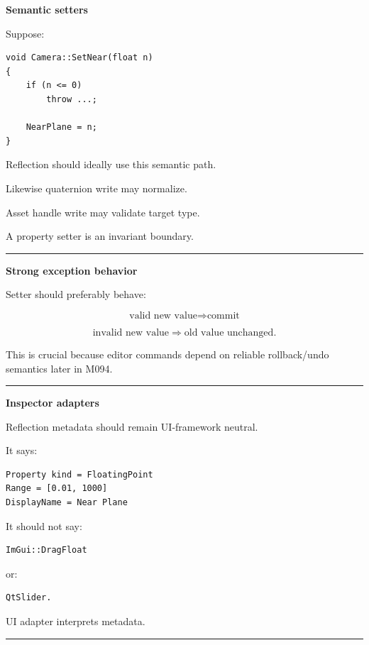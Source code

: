 \textbf{Semantic setters}

Suppose:

\begin{verbatim}
void Camera::SetNear(float n)
{
    if (n <= 0)
        throw ...;

    NearPlane = n;
}
\end{verbatim}

Reflection should ideally use this semantic path.

Likewise quaternion write may normalize.

Asset handle write may validate target type.

A property setter is an invariant boundary.

\begin{center}\rule{0.5\linewidth}{0.5pt}\end{center}

\textbf{Strong exception behavior}

Setter should preferably behave:

\[
\text{valid new value}
\Rightarrow
\text{commit}
\]

\[
\text{invalid new value}
\Rightarrow
\text{old value unchanged}.
\]

This is crucial because editor commands depend on reliable rollback/undo semantics later in M094.

\begin{center}\rule{0.5\linewidth}{0.5pt}\end{center}

\textbf{Inspector adapters}

Reflection metadata should remain UI-framework neutral.

It says:

\begin{verbatim}
Property kind = FloatingPoint
Range = [0.01, 1000]
DisplayName = Near Plane
\end{verbatim}

It should not say:

\begin{verbatim}
ImGui::DragFloat
\end{verbatim}

or:

\begin{verbatim}
QtSlider.
\end{verbatim}

UI adapter interprets metadata.

\begin{center}\rule{0.5\linewidth}{0.5pt}\end{center}

